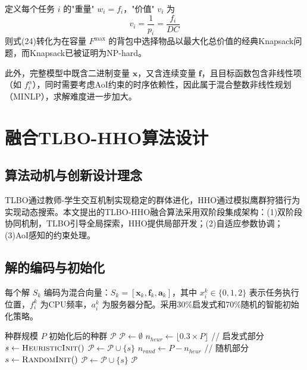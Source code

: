 \documentclass[conference]{IEEEtran}
\begin{document}
定义每个任务 $i$ 的"重量" $w_i = f_i$，"价值" $v_i$ 为
\begin{equation}
v_i = \frac{1}{p_i} = \frac{f_i}{DC}
\end{equation}
则式(24)转化为在容量 $F^{\max}$ 的背包中选择物品以最大化总价值的经典Knapsack问题，而Knapsack已被证明为NP-hard。

此外，完整模型中既含二进制变量 $\mathbf{x}$，又含连续变量 $\mathbf{f}$，且目标函数包含非线性项（如 $f_i^{\alpha}$），同时需要考虑AoI约束的时序依赖性，因此属于混合整数非线性规划（MINLP），求解难度进一步加大。

\section{融合TLBO-HHO算法设计}
\subsection{算法动机与创新设计理念}
TLBO通过教师-学生交互机制实现稳定的群体进化，HHO通过模拟鹰群狩猎行为实现动态搜索。本文提出的TLBO-HHO融合算法采用双阶段集成架构：(1)双阶段协同机制，TLBO引导全局探索，HHO提供局部开发；(2)自适应参数协调；(3)AoI感知的约束处理。

\subsection{解的编码与初始化}
每个解 $S_k$ 编码为混合向量：$S_k = [\mathbf{x}_k, \mathbf{f}_k, \mathbf{a}_k]$，其中 $x_i^k \in \{0, 1, 2\}$ 表示任务执行位置，$f_i^k$ 为CPU频率，$a_i^k$ 为服务器分配。采用30\%启发式和70\%随机的智能初始化策略。

\begin{algorithm}[H]
  \small
  \caption{智能初始化策略}
  \label{alg:init}
  \begin{algorithmic}[1]
    \REQUIRE 种群规模 $P$
    \ENSURE 初始化后的种群 $\mathcal{P}$
    \STATE $\mathcal{P} \leftarrow \emptyset$
    \STATE $n_{heur} \leftarrow \lfloor 0.3 \times P \rfloor$ // 启发式部分
        \STATE $s \leftarrow \textsc{HeuristicInit}()$
        \STATE $\mathcal{P} \leftarrow \mathcal{P} \cup \{s\}$
    \ENDFOR
    \STATE $n_{rand} \leftarrow P - n_{heur}$ // 随机部分
        \STATE $s \leftarrow \textsc{RandomInit}()$
        \STATE $\mathcal{P} \leftarrow \mathcal{P} \cup \{s\}$
    \ENDFOR
    \RETURN $\mathcal{P}$
  \end{algorithmic}
\end{algorithm}
\end{document}
